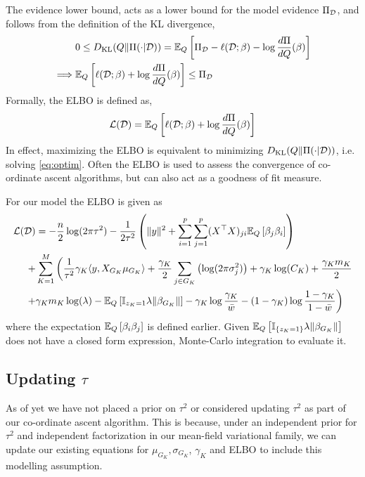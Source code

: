 \documentclass[12pt]{article}
\begin{document}
The evidence lower bound, acts as a lower bound for the model evidence $\Pi_{\mathcal{D}}$, and follows from the definition of the KL divergence,
\begin{align*}
 & 0 \leq D_\text{KL}(Q \| \Pi(\cdot | \mathcal{D})) = \mathbb{E}_Q \left[ \Pi_{\mathcal{D}} - \ell(\mathcal{D}; \beta) - \log \frac{d\Pi}{dQ} (\beta) \right] \\
    \implies & \mathbb{E}_Q \left[ \ell(\mathcal{D}; \beta) + \log \frac{d\Pi}{dQ} (\beta) \right] \leq \Pi_{\mathcal{D}}
\end{align*}
Formally, the ELBO is defined as,
\begin{equation}
   \mathcal{L}(\mathcal{D}) = \mathbb{E}_Q \left[ \ell(\mathcal{D}; \beta) + \log \frac{d\Pi}{dQ}(\beta) \right]
\end{equation}
In effect, maximizing the ELBO is equivalent to minimizing $D_\text{KL}(Q \| \Pi(\cdot | \mathcal{D})) $, i.e. solving \eqref{eq:optim}. Often the ELBO is used to assess the convergence of co-ordinate ascent algorithms, but can also act as a goodness of fit measure.

For our model the ELBO is given as
\begin{equation} \label{eq:elbo} 
\begin{aligned}
    \mathcal{L}(\mathcal{D}) &= 
- 
    \frac{n}{2} \log(2 \pi \tau^2) 
- 
    \frac{1}{2\tau^2} \left( \| y \|^2  + \sum_{i=1}^p \sum_{j=1}^p (X^\top X)_{ji} \mathbb{E}_Q \left[ \beta_j \beta_i \right] \right)\\
+& 
    \sum_{K=1}^M \bigg(  
\frac{1}{\tau^2} \gamma_K \langle y, X_{G_K} \mu_{G_K} \rangle
+
    \frac{\gamma_K}{2} \sum_{j \in G_K} \left( \log( 2 \pi \sigma_j^2) \right)
+
    \gamma_K \log(C_K)
+ 
    \frac{\gamma_K m_K}{2} \\
+ &
    \gamma_K m_K \log (\lambda)
-
    \mathbb{E}_Q \left[ \mathbb{I}_{z_K =1} \lambda \| \beta_{G_K} \| \right]
-
    \gamma_K \log \frac{\gamma_K}{\bar{w}}
-
    (1-\gamma_K) \log \frac{1 - \gamma_K}{1 - \bar{w}}
\bigg)
\end{aligned}
\end{equation}
where the expectation $\mathbb{E}_Q \left[ \beta_i \beta_j \right]$ is defined earlier. Given $\mathbb{E}_Q \left[ \mathbb{I}_{\{z_K = 1\}} \lambda \| \beta_{G_K} \| \right] $ does not have a closed form expression, Monte-Carlo integration to evaluate it.

\subsection{Updating $\tau$}

As of yet we have not placed a prior on $\tau^2$ or considered updating $\tau^2$ as part of our co-ordinate ascent algorithm. This is because, under an independent prior for $\tau^2$ and independent factorization in our mean-field variational family, we can update our existing equations for $\mu_{G_K}, \sigma_{G_K}$, $\gamma_K$ and ELBO to include this modelling assumption.
\end{document}

